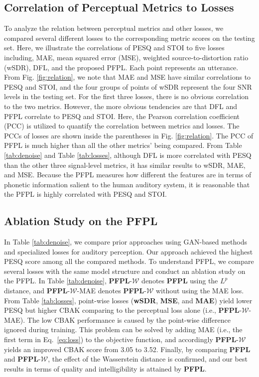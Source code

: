 \documentclass[a4paper]{article}
\begin{document}
\subsection{Correlation of Perceptual Metrics to Losses}
\label{ssec:relation_of_pesq_to_losses}
To analyze the relation between perceptual metrics and other losses, we compared several different losses to the corresponding metric scores on the testing set. Here, we illustrate the correlations of PESQ and STOI to five losses including, MAE, mean squared error (MSE), weighted source-to-distortion ratio (wSDR), DFL, and the proposed PFPL. Each point represents an utterance. From Fig. \ref{fig:relation}, we note that MAE and MSE have similar correlations to PESQ and STOI, and the four groups of points of wSDR represent the four SNR levels in the testing set. For the first three losses, there is no obvious correlation to the two metrics. However, the more obvious tendencies are that DFL and PFPL correlate to PESQ and STOI. Here, the Pearson correlation coefficient (PCC) is utilized to quantify the correlation between metrics and losses. The PCCs of losses are shown inside the parentheses in Fig. \ref{fig:relation}. The PCC of PFPL is much higher than all the other metrics' being compared. From Table \ref{tab:denoise} and Table \ref{tab:losses}, although DFL is more correlated with PESQ than the other three signal-level metrics, it has similar results to wSDR, MAE, and MSE. Because the PFPL measures how different the features are in terms of phonetic information salient to the human auditory system, it is reasonable that the PFPL is highly correlated with PESQ and STOI.
\subsection{Ablation Study on the PFPL}
\label{ssec:qualitative_analysis}
 In Table \ref{tab:denoise}, we compare prior approaches using GAN-based methods and specialized losses for auditory perception. Our approach achieved the highest PESQ score among all the compared methods. To understand PFPL, we compare several losses with the same model structure and conduct an ablation study on the PFPL. In Table \ref{tab:denoise}, {\bf PFPL}-$\mathcal{W}$ denotes {\bf PFPL} using the $L^p$ distance, and {\bf PFPL}-$\mathcal{W}$-MAE denotes {\bf PFPL}-$\mathcal{W}$ without using the MAE loss. From Table \ref{tab:losses}, point-wise losses (\textbf{wSDR}, \textbf{MSE}, and \textbf{MAE}) yield lower PESQ but higher CBAK comparing to the perceptual loss alone (i.e., {\bf PFPL}-$\mathcal{W}$-MAE). The low CBAK performance is caused by the point-wise difference ignored during training. This problem can be solved by adding MAE (i.e., the first term in Eq.~\eqref{eq:loss}) to the objective function, and accordingly {\bf PFPL}-$\mathcal{W}$ yields an improved CBAK score from 3.05 to 3.52. 
 Finally, by comparing {\bf PFPL} and {\bf PFPL}-$\mathcal{W}$,  the effect of the Wasserstein distance is confirmed, and our best results in terms of quality and intelligibility is attained by {\bf PFPL}.
\end{document}
